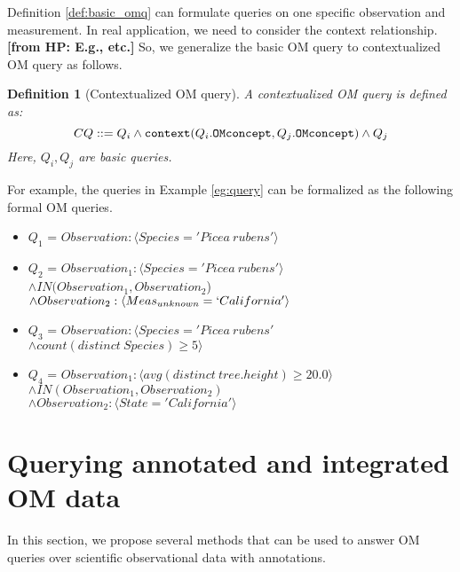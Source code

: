 \documentclass[conference]{IEEEtran}
\newtheorem{example}{\bf Example}[section]
\newtheorem{definition}{\bf Definition}[section]
\newcommand{\from}[2]{{\bf[{\sc from #1:} #2]}}
\begin{document}
Definition \ref{def:basic_omq} can formulate queries on
one specific observation and measurement. 
In real application, we need to consider the context relationship. 
\from{HP}{E.g., etc.}
So, we generalize the basic OM query to contextualized OM query as
follows. 

\begin{definition}[Contextualized OM query]\label{def:context_omq} A
  contextualized OM query is defined as:
\[CQ ::=Q_i \wedge {\tt context}(Q_i.{\tt OMconcept}, Q_j.{\tt
  OMconcept})\wedge Q_j\]
Here, $Q_i, Q_j$ are basic queries.
\end{definition}

For example, the queries in Example \ref{eg:query} can be formalized
as the following formal OM queries. 

\begin{itemize}
\item $Q_1$ = $Observation: \langle Species='Picea~rubens'\rangle$
\item $Q_2$ = $Observation_1: \langle Species='Picea~rubens'\rangle$\\
  $\wedge IN(Observation_1, Observation_2$) \\
$\wedge Observation_2: \langle Meas_{unknown}=`California'\rangle$
\item $Q_3$ = $Observation: \langle Species='Picea~rubens'$\\
$\wedge count(distinct~Species)\geq 5\rangle$
\item $Q_4$ = $Observation_1: \langle avg(distinct~tree.height)\geq 20.0 \rangle$ 
$\wedge IN(Observation_1, Observation_2)$\\
$\wedge Observation_2: \langle State='California'\rangle$\\
\end{itemize}




\section{Querying annotated and integrated OM data}

In this section, we propose several methods that can be used to
answer OM queries over scientific observational data with
annotations. 
\end{document}
